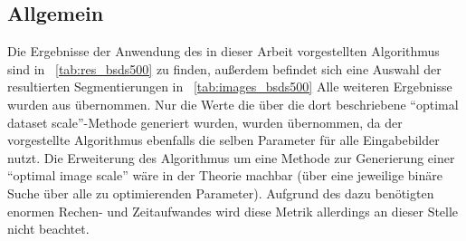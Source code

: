 \subsection{Allgemein}
\label{ssec:results_general}
Die Ergebnisse der Anwendung des in dieser Arbeit vorgestellten Algorithmus sind in \tablename~\ref{tab:res_bsds500} zu finden, außerdem befindet sich eine Auswahl der resultierten Segmentierungen in \tablename~\ref{tab:images_bsds500} Alle weiteren Ergebnisse wurden aus \cite{arbelaez_10} übernommen. Nur die Werte die über die dort beschriebene \enquote{optimal dataset scale}-Methode generiert wurden, wurden übernommen, da der vorgestellte Algorithmus ebenfalls die selben Parameter für alle Eingabebilder nutzt. Die Erweiterung des Algorithmus um eine Methode zur Generierung einer \enquote{optimal image scale} wäre in der Theorie machbar (\bspw über eine jeweilige binäre Suche über alle zu optimierenden Parameter). Aufgrund des dazu benötigten enormen Rechen- und Zeitaufwandes wird diese Metrik allerdings an dieser Stelle nicht beachtet.

